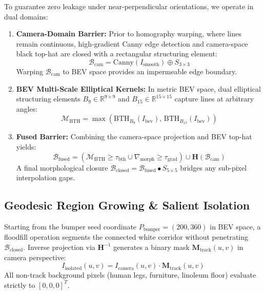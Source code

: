 \documentclass[10pt,journal,compsoc]{IEEEtran}
\begin{document}
To guarantee zero leakage under near-perpendicular orientations, we operate in dual domains:
\begin{enumerate}
    \item \textbf{Camera-Domain Barrier:} Prior to homography warping, where lines remain continuous, high-gradient Canny edge detection and camera-space black top-hat are closed with a rectangular structuring element:
    \begin{equation}
    \mathcal{B}_{\text{cam}} = \text{Canny}(I_{\text{smooth}}) \oplus S_{3 \times 3}
    \end{equation}
    Warping $\mathcal{B}_{\text{cam}}$ to BEV space provides an impermeable edge boundary.
    \item \textbf{BEV Multi-Scale Elliptical Kernels:} In metric BEV space, dual elliptical structuring elements $B_9 \in \mathbb{R}^{9 \times 9}$ and $B_{15} \in \mathbb{R}^{15 \times 15}$ capture lines at arbitrary angles:
    \begin{equation}
    \mathcal{M}_{\text{BTH}} = \max\left(\text{BTH}_{B_9}(I_{\text{bev}}), \, \text{BTH}_{B_{15}}(I_{\text{bev}})\right)
    \end{equation}
    \item \textbf{Fused Barrier:} Combining the camera-space projection and BEV top-hat yields:
    \begin{equation}
    \mathcal{B}_{\text{fused}} = \left(\mathcal{M}_{\text{BTH}} \ge \tau_{\text{bth}} \cup \nabla_{\text{morph}} \ge \tau_{\text{grad}}\right) \cup \mathbf{H}(\mathcal{B}_{\text{cam}})
    \end{equation}
    A final morphological closure $\mathcal{B}_{\text{closed}} = \mathcal{B}_{\text{fused}} \bullet S_{5 \times 5}$ bridges any sub-pixel interpolation gaps.
\end{enumerate}

\subsection{Geodesic Region Growing \& Salient Isolation}
Starting from the bumper seed coordinate $P_{\text{bumper}} = (200, 360)$ in BEV space, a floodfill operation segments the connected white corridor without penetrating $\mathcal{B}_{\text{closed}}$. Inverse projection via $\mathbf{H}^{-1}$ generates a binary mask $\mathbf{M}_{\text{track}}(u, v)$ in camera perspective:
\begin{equation}
I_{\text{isolated}}(u, v) = I_{\text{camera}}(u, v) \cdot \mathbf{M}_{\text{track}}(u, v)
\end{equation}
All non-track background pixels (human legs, furniture, linoleum floor) evaluate strictly to $[0, 0, 0]^T$.
\end{document}

